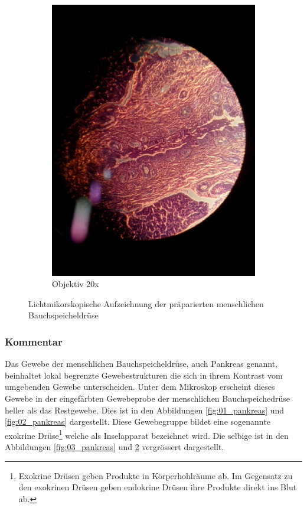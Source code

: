 \begin{figure}[h!]
\begin{subfigure}[b]{0.45\textwidth}
		\includegraphics[angle=270, width=1\textwidth]{../images/04_pankreas.jpg}
		\caption{Objektiv 20x}
		\label{fig:04_pankreas}
	\end{subfigure}
	\caption{Lichtmikorskopische Aufzeichnung der präparierten
		menschlichen Bauchspeicheldrüse}
\end{figure}

\subsubsection{Kommentar}
Das Gewebe der menschlichen Bauchspeicheldrüse, auch Pankreas genannt,
beinhaltet lokal begrenzte Gewebestrukturen die sich in ihrem Kontrast vom
umgebenden Gewebe unterscheiden. Unter dem Mikroskop erscheint dieses Gewebe
in der eingefärbten Gewebeprobe der menschlichen Bauchspeichedrüse heller als
das Restgewebe. Dies ist in den Abbildungen \ref{fig:01_pankreas} und
\ref{fig:02_pankreas} dargestellt. Diese Gewebegruppe bildet eine sogenannte
exokrine Drüse\footnote{Exokrine Drüsen geben Produkte in Körperhohlräume ab.
Im Gegensatz zu den exokrinen Drüsen geben endokrine Drüsen ihre Produkte
direkt ins Blut ab.} welche als Inselapparat bezeichnet wird. Die selbige ist
in den Abbildungen \ref{fig:03_pankreas} und \ref{fig:04_pankreas} vergrössert
dargestellt.

